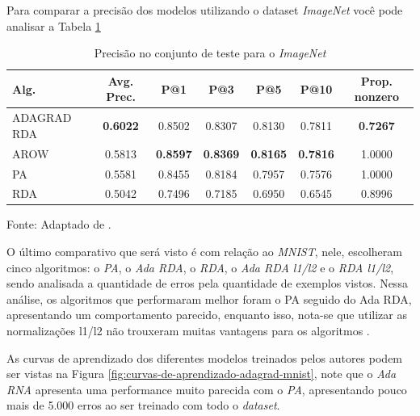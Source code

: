 Para comparar a precisão dos modelos utilizando o dataset \textit{ImageNet} você pode analisar a Tabela \ref{tab:resultados-imagenet-adagrad}

\begin{table}[htbp]
    \centering
    \begin{threeparttable} %
        \caption{Precisão no conjunto de teste para o \textit{ImageNet}}
        \label{tab:resultados-imagenet-adagrad}
        \begin{tabular}{l c c c c c c}
            \toprule
            Alg. & Avg. Prec. & P@1 & P@3 & P@5 & P@10 & Prop. nonzero \\
            \midrule
            ADAGRAD RDA & \textbf{0.6022} & 0.8502 & 0.8307 & 0.8130 & 0.7811 & \textbf{0.7267} \\
            AROW & 0.5813 & \textbf{0.8597} & \textbf{0.8369} & \textbf{0.8165} & \textbf{0.7816} & 1.0000 \\
            PA & 0.5581 & 0.8455 & 0.8184 & 0.7957 & 0.7576 & 1.0000 \\
            RDA & 0.5042 & 0.7496 & 0.7185 & 0.6950 & 0.6545 & 0.8996 \\
            \bottomrule
        \end{tabular}
        
        \begin{tablenotes}[para] %
            \small %
            \item[] Fonte: Adaptado de \parencite{AdaGradMethod}.
        \end{tablenotes}

    \end{threeparttable} %
\end{table}

O último comparativo que será visto é com relação ao \textit{MNIST}, nele, \textcite{AdaGradMethod} escolheram cinco algoritmos: o \textit{PA}, o \textit{Ada RDA}, o \textit{RDA}, o \textit{Ada RDA l1/l2} e o \textit{RDA l1/l2}, sendo analisada a quantidade de erros pela quantidade de exemplos vistos. Nessa análise, os algoritmos que performaram melhor foram o PA seguido do Ada RDA, apresentando um comportamento parecido, enquanto isso, nota-se que utilizar as normalizações l1/l2 não trouxeram muitas vantagens para os algoritmos \parencite{AdaGradMethod}.

As curvas de aprendizado dos diferentes modelos treinados pelos autores podem ser vistas na Figura \ref{fig:curvas-de-aprendizado-adagrad-mnist}, note que o \textit{Ada RNA} apresenta uma performance muito parecida com o \textit{PA}, apresentando pouco mais de 5.000 erros ao ser treinado com todo o \textit{dataset}.

